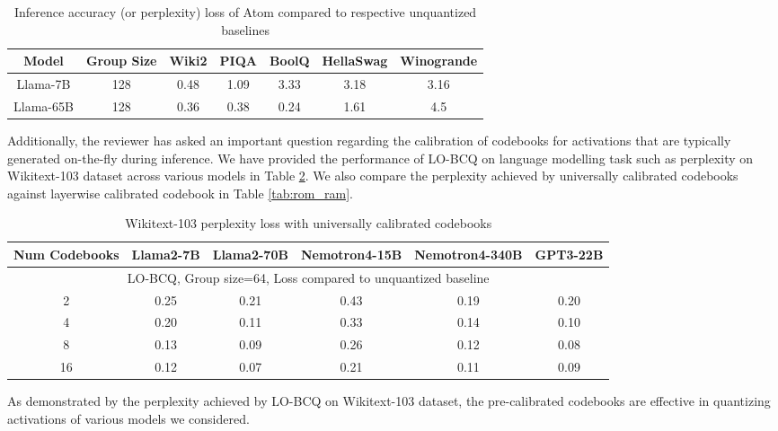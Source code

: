 \begin{table}[h]
\centering
\begin{tabular}{|c|c|c|c|c|c|c|} 
\hline
 Model &  Group Size & Wiki2  & PIQA & BoolQ & HellaSwag & Winogrande \\
\hline
Llama-7B & 128 & 0.48 & 1.09 & 3.33 & 3.18 & 3.16 \\
\hline
Llama-65B & 128 & 0.36 & 0.38 & 0.24 & 1.61 & 4.5 \\
\hline
    \end{tabular}
    \caption{Inference accuracy (or perplexity) loss of Atom compared to respective unquantized baselines}
    \label{tab:atom}
\end{table}

Additionally, the reviewer has asked an important question regarding the calibration of codebooks for activations that are typically generated on-the-fly during inference. We have provided the performance of LO-BCQ on language modelling task such as perplexity on Wikitext-103 dataset across various models in Table \ref{tab:rom_cb}. We also compare the perplexity achieved by universally calibrated codebooks against layerwise calibrated codebook in Table \ref{tab:rom_ram}.

\begin{table}[h]
\centering
\begin{tabular}{|c|c|c|c|c|c|} 
\hline
Num Codebooks &  Llama2-7B & Llama2-70B  & Nemotron4-15B & Nemotron4-340B & GPT3-22B  \\
\hline
\hline
  \multicolumn{6}{c}{LO-BCQ, Group size=64, Loss compared to unquantized baseline} \\ 
 \hline
2 & 0.25 & 0.21 & 0.43 & 0.19 & 0.20 \\
\hline
4 &	0.20 &	0.11 &	0.33 &	0.14 &	0.10 \\
\hline
8 &	0.13 &	0.09 &	0.26 &	0.12 &	0.08 \\
\hline
16 & 0.12 &	0.07 &	0.21 &	0.11 &	0.09 \\
\hline
 \end{tabular}
    \caption{Wikitext-103 perplexity loss with universally calibrated codebooks}
    \label{tab:rom_cb}
\end{table}

As demonstrated by the perplexity achieved by LO-BCQ on Wikitext-103 dataset, the pre-calibrated codebooks are effective in quantizing activations of various models we considered. 

